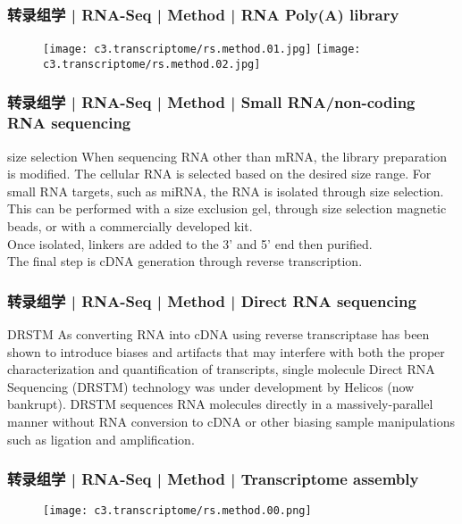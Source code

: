 \begin{frame}
  \frametitle{转录组学 | RNA-Seq | Method | RNA Poly(A) library}
  \begin{figure}
    \centering
    \texttt{[image: c3.transcriptome/rs.method.01.jpg]}
    \texttt{[image: c3.transcriptome/rs.method.02.jpg]}
  \end{figure}
\end{frame}

\begin{frame}
  \frametitle{转录组学 | RNA-Seq | Method | Small RNA/non-coding RNA sequencing}
  \begin{block}{size selection}
 When sequencing RNA other than mRNA, the library preparation is modified. The cellular RNA is selected based on the desired size range. For small RNA targets, such as miRNA, the RNA is isolated through size selection. This can be performed with a size exclusion gel, through size selection magnetic beads, or with a commercially developed kit.\\
 \vspace{1em}
 Once isolated, linkers are added to the 3' and 5' end then purified.\\
 \vspace{1em}
 The final step is cDNA generation through reverse transcription. 
  \end{block}
\end{frame}

\begin{frame}
  \frametitle{转录组学 | RNA-Seq | Method | Direct RNA sequencing}
  \begin{block}{DRSTM}
  As converting RNA into cDNA using reverse transcriptase has been shown to introduce biases and artifacts that may interfere with both the proper characterization and quantification of transcripts, single molecule Direct RNA Sequencing (DRSTM) technology was under development by Helicos (now bankrupt). DRSTM sequences RNA molecules directly in a massively-parallel manner without RNA conversion to cDNA or other biasing sample manipulations such as ligation and amplification.
  \end{block}
\end{frame}

\begin{frame}
  \frametitle{转录组学 | RNA-Seq | Method | Transcriptome assembly}
  \begin{figure}
    \centering
    \texttt{[image: c3.transcriptome/rs.method.00.png]}
  \end{figure}
\end{frame}


